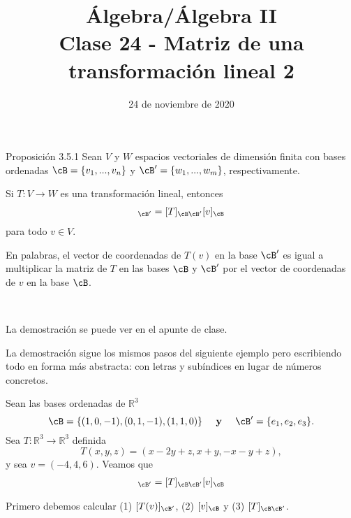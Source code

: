 \documentclass[handout]{beamer} %
\title[Clase 24 -  Matriz de una transformación lineal 2]{Álgebra/Álgebra II \\ Clase 24 - Matriz de una transformación lineal 2}
\author[]{}
\institute[]{\normalsize FAMAF / UNC
	\\[\baselineskip] ${}^{}$
	\\[\baselineskip]
}
\date[24/11/2020]{24 de noviembre de 2020}
\newcommand{\R}{\mathbb R}
\begin{document}
\begin{frame}
\maketitle
\end{frame}




\begin{frame}

\begin{block}{Proposición 3.5.1}
Sean $V$ y $W$ espacios vectoriales de dimensión finita con bases ordenadas $\cB=\{v_1, ..., v_n\}$ y $\cB'=\{w_1, ..., w_m\}$, respectivamente. 

Si $T:V\longrightarrow W$ es una transformación lineal, entonces
\begin{align*}
[T(v)]_{\cB'}=[T]_{\cB\cB'}[v]_{\cB}
\end{align*}
para todo $v\in V$.
\end{block}
\pause
En palabras, el vector de coordenadas de $T(v)$ en la base $\cB'$ es igual a multiplicar la matriz de $T$ en las bases $\cB$ y $\cB'$ por el vector de coordenadas de $v$ en la base $\cB$.

\



\end{frame}

\begin{frame}
La demostración se puede ver en el apunte de clase.
\pause
\

La demostración sigue los mismos pasos del siguiente ejemplo pero escribiendo todo en forma más abstracta: con letras y subíndices en lugar de números concretos.
\end{frame}



\begin{frame}
	\begin{ejemplo}
		Sean las bases ordenadas de $\R^3$
		$$\cB = \{(1,0,-1),(0,1,-1),(1,1,0)\}\quad \textbf{ y } \quad\cB' = \{e_1,e_2,e_3\}.$$ 
		Sea $T: \R^3 \to \R^3$ definida
		$$
		T(x,y,z) = (x-2y+z, x+y, -x-y+z),
		$$ 
		y sea $v=(-4,4,6)$. Veamos  que 
	\begin{align*}
		[T(v)]_{\cB'}=[T]_{\cB\cB'}[v]_{\cB}
		\end{align*}
	\end{ejemplo}\pause
	\begin{solucion}\pause
		Primero debemos calcular (1) $[T(v)]_{\cB'}$,\; (2) $[v]_{\cB}$\; y \;(3) $[T]_{\cB\cB'}$.
	\end{solucion}	
\end{frame}
\end{document}
